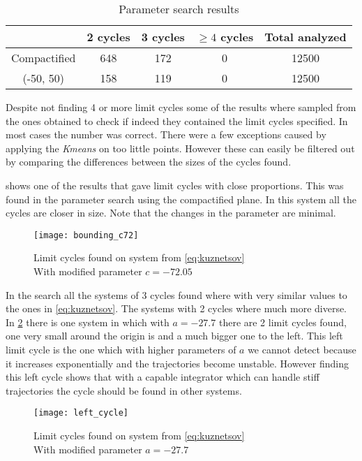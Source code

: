 \begin{table}[H]
    \centering
    \caption{Parameter search results}%
    \label{tab:par}
    \begin{tabular}{ccccc}
        \toprule
        & 2 cycles & 3 cycles & $\geq4$ cycles & Total analyzed\\
        \midrule
        Compactified & 648 & 172 & 0 & 12500 \\
        (-50, 50) & 158 & 119 & 0 & 12500 \\
        \bottomrule
    \end{tabular}
\end{table}

Despite not finding 4 or more limit cycles some of the results where sampled from the
ones obtained to check if indeed they contained the limit cycles specified. In most cases
the number was correct. There were a few exceptions caused by applying the \emph{Kmeans}
on too little points. However these can easily be filtered out by comparing the differences
between the sizes of the cycles found.

 shows one of the results that gave limit cycles with
close proportions. This was found in the parameter search using the compactified
plane. In this system all the cycles are closer in size. Note that the changes in the
parameter are minimal.

\begin{figure}[H]
    \centering
    \texttt{[image: bounding\_c72]}
    \caption{Limit cycles found on system from \cref{eq:kuznetsov} \\
        With modified parameter $c=-72.05$
    }%
    \label{fig:bounding_c72}
\end{figure}

In the search all the systems of 3 cycles found where with
very similar values to the ones in \cref{eq:kuznetsov}. The systems with 2 cycles where
much more diverse. In \cref{fig:bounding_left} there is one system in which with
$a=-27.7$ there are 2 limit cycles found, one very small around
the origin is and a much bigger one to the left. This left limit cycle is the
one which with higher parameters of $a$ we cannot detect because it increases
exponentially and the trajectories become unstable. However finding this left cycle
shows that with a capable integrator which can handle stiff trajectories the cycle should
be found in other systems.

\begin{figure}[H]
    \centering
    \texttt{[image: left\_cycle]}
    \caption{Limit cycles found on system from \cref{eq:kuznetsov} \\
        With modified parameter $a=-27.7$
    }%
    \label{fig:bounding_left}
\end{figure}
